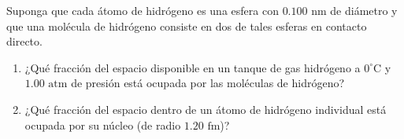 \item Suponga que cada átomo de hidrógeno es una esfera con $0.100\text{ nm}$ de diámetro y que una molécula de hidrógeno consiste en dos de tales esferas en contacto directo.
\begin{enumerate}
    \item ¿Qué fracción del espacio disponible en un tanque de gas hidrógeno a $0^\circ\text{C}$ y $1.00\text{ atm}$ de presión está ocupada por las moléculas de hidrógeno?
    \item ¿Qué fracción del espacio dentro de un átomo de hidrógeno individual está ocupada por su núcleo (de radio $1.20\text{ fm}$)?
\end{enumerate}